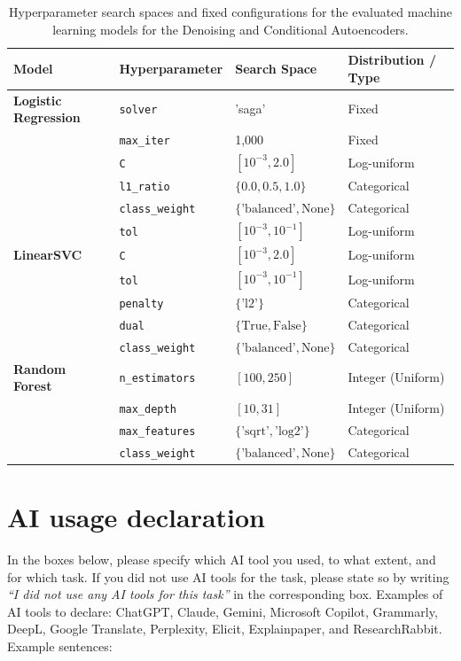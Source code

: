 \documentclass[11pt]{article}
\begin{document}
\begin{table}[htbp]
\centering
\caption{Hyperparameter search spaces and fixed configurations for the evaluated machine learning models for the Denoising and Conditional Autoencoders.}\label{tab:ae_ml_hyperparameters}
\label{tab:hyperparameters}
\begin{tabular}{llll}
\toprule
\textbf{Model} & \textbf{Hyperparameter} & \textbf{Search Space} & \textbf{Distribution / Type} \\
\midrule
\textbf{Logistic Regression} & \texttt{solver} & 'saga' & Fixed \\
 & \texttt{max\_iter} & 1,000 & Fixed \\
 & \texttt{C} & $[10^{-3}, 2.0]$ & Log-uniform \\
 & \texttt{l1\_ratio} & $\{0.0, 0.5, 1.0\}$ & Categorical \\
 & \texttt{class\_weight} & $\{\text{'balanced'}, \text{None}\}$ & Categorical \\
 & \texttt{tol} & $[10^{-3}, 10^{-1}]$ & Log-uniform \\
\midrule
\textbf{LinearSVC} & \texttt{C} & $[10^{-3}, 2.0]$ & Log-uniform \\
 & \texttt{tol} & $[10^{-3}, 10^{-1}]$ & Log-uniform \\
 & \texttt{penalty} & $\{\text{'l2'}\}$ & Categorical \\
 & \texttt{dual} & $\{\text{True}, \text{False}\}$ & Categorical \\
 & \texttt{class\_weight} & $\{\text{'balanced'}, \text{None}\}$ & Categorical \\
\midrule
\textbf{Random Forest} & \texttt{n\_estimators} & $[100, 250]$ & Integer (Uniform) \\
 & \texttt{max\_depth} & $[10, 31]$ & Integer (Uniform) \\
 & \texttt{max\_features} & $\{\text{'sqrt'}, \text{'log2'}\}$ & Categorical \\
 & \texttt{class\_weight} & $\{\text{'balanced'}, \text{None}\}$ & Categorical \\
\bottomrule
\end{tabular}
\end{table}

\clearpage

\section{AI usage declaration}\label{sec:ai-declaration}

In the boxes below, please specify which AI tool you used, to what extent, and for which task. If you did not use AI tools for the task, please state so by writing \textit{``I did not use any AI tools for this task''} in the corresponding box. Examples of AI tools to declare: ChatGPT, Claude, Gemini, Microsoft Copilot, Grammarly, DeepL, Google Translate, Perplexity, Elicit, Explainpaper, and ResearchRabbit. Example sentences:
\end{document}
